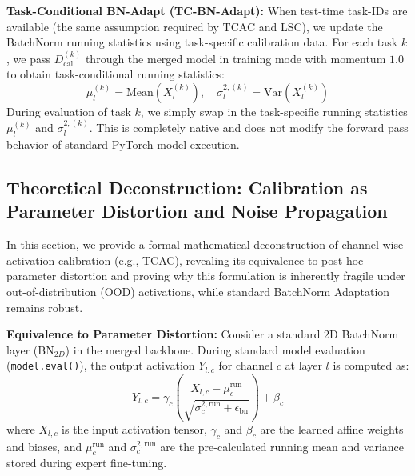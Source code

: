 \documentclass{article}
\begin{document}
\textbf{Task-Conditional BN-Adapt (TC-BN-Adapt):} When test-time task-IDs are available (the same assumption required by TCAC and LSC), we update the BatchNorm running statistics using task-specific calibration data. For each task $k$, we pass $D^{(k)}_{\text{cal}}$ through the merged model in training mode with momentum $1.0$ to obtain task-conditional running statistics:
\begin{equation}
    \mu^{(k)}_l = \text{Mean}(X_l^{(k)}), \quad \sigma^{2,(k)}_l = \text{Var}(X_l^{(k)})
\end{equation}
During evaluation of task $k$, we simply swap in the task-specific running statistics $\mu^{(k)}_l$ and $\sigma^{2,(k)}_l$. This is completely native and does not modify the forward pass behavior of standard PyTorch model execution.

\subsection{Theoretical Deconstruction: Calibration as Parameter Distortion and Noise Propagation}
In this section, we provide a formal mathematical deconstruction of channel-wise activation calibration (e.g., TCAC), revealing its equivalence to post-hoc parameter distortion and proving why this formulation is inherently fragile under out-of-distribution (OOD) activations, while standard BatchNorm Adaptation remains robust.

\textbf{Equivalence to Parameter Distortion:}
Consider a standard 2D BatchNorm layer ($\mathrm{BN}_{2D}$) in the merged backbone. During standard model evaluation (\texttt{model.eval()}), the output activation $Y_{l,c}$ for channel $c$ at layer $l$ is computed as:
\begin{equation}
    Y_{l,c} = \gamma_c \left( \frac{X_{l,c} - \mu^{\mathrm{run}}_c}{\sqrt{\sigma^{2,\mathrm{run}}_c + \epsilon_{\mathrm{bn}}}} \right) + \beta_c
\end{equation}
where $X_{l,c}$ is the input activation tensor, $\gamma_c$ and $\beta_c$ are the learned affine weights and biases, and $\mu^{\mathrm{run}}_c$ and $\sigma^{2,\mathrm{run}}_c$ are the pre-calculated running mean and variance stored during expert fine-tuning.
\end{document}
